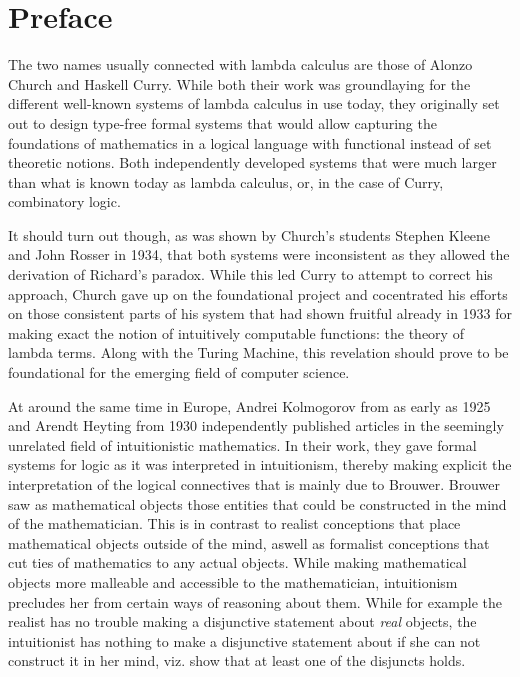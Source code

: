 \chapter[Preface]{Preface\LARGE{\footnotemark{}}}

The two names usually connected with lambda calculus are those of Alonzo Church
and Haskell Curry. While both their work was groundlaying for the different
well-known systems of lambda calculus in use today, they originally set out to
design type-free formal systems that would allow capturing the foundations of
mathematics in a logical language with functional instead of set theoretic
notions. Both independently developed systems that were much larger than what is
known today as lambda calculus, or, in the case of Curry, combinatory logic.

It should turn out though, as was shown by Church's students Stephen Kleene and
John Rosser in 1934, that both systems were inconsistent as they allowed the
derivation of Richard's paradox. While this led Curry to attempt to correct his
approach, Church gave up on the foundational project and cocentrated his efforts
on those consistent parts of his system that had shown fruitful already in 1933
for making exact the notion of intuitively computable functions: the theory of
lambda terms. Along with the Turing Machine, this revelation should prove to be
foundational for the emerging field of computer science.

At around the same time in Europe, Andrei Kolmogorov from as early as 1925 and
Arendt Heyting from 1930 independently published articles in the seemingly
unrelated field of intuitionistic mathematics. In their work, they gave formal
systems for logic as it was interpreted in intuitionism, thereby making explicit
the interpretation of the logical connectives that is mainly due to Brouwer.
Brouwer saw as mathematical objects those entities that could be constructed in
the mind of the mathematician. This is in contrast to realist conceptions that
place mathematical objects outside of the mind, aswell as formalist conceptions
that cut ties of mathematics to any actual objects. While making mathematical
objects more malleable and accessible to the mathematician, intuitionism
precludes her from certain ways of reasoning about them. While for example the
realist has no trouble making a disjunctive statement about \textit{real}
objects, the intuitionist has nothing to make a disjunctive statement about if
she can not construct it in her mind, viz. show that at least one of the
disjuncts holds.

